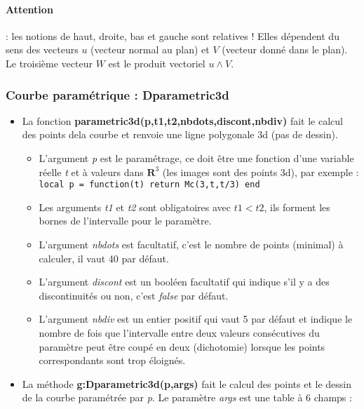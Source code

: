 \paragraph{Attention} : les notions de haut, droite, bas et gauche sont relatives ! Elles dépendent du sens des vecteurs $u$ (vecteur normal au plan) et $V$ (vecteur donné dans le plan). Le troisième vecteur $W$ est le produit vectoriel $u\wedge V$.

\subsubsection{Courbe paramétrique : Dparametric3d}

\begin{itemize}
\item La fonction \textbf{parametric3d(p,t1,t2,nbdots,discont,nbdiv)} fait le calcul des points dela courbe et renvoie une ligne polygonale 3d (pas de dessin).
  \begin{itemize}
    \item L'argument \emph{p} est le paramétrage, ce doit être une fonction d'une variable réelle \emph{t} et à valeurs dans $\mathbf R^3$ (les images sont des points 3d), par exemple :
    \texttt{local p = function(t) return Mc(3,t,t/3) end}
    
    \item  Les arguments \emph{t1} et \emph{t2} sont obligatoires avec \(t1 < t2\), ils forment les bornes de l'intervalle pour le paramètre.
    
    \item L'argument \emph{nbdots} est facultatif, c'est le nombre de points (minimal) à calculer, il vaut 40 par défaut.
    
    \item L'argument \emph{discont} est un booléen facultatif qui indique s'il y a des discontinuités ou non, c'est \emph{false} par défaut.
    
    \item L'argument \emph{nbdiv} est un entier positif qui vaut 5 par défaut et indique le nombre de fois que l'intervalle entre deux valeurs consécutives du paramètre peut être coupé en deux (dichotomie) lorsque les points correspondants sont trop éloignés.
  \end{itemize}
  
\item La méthode \textbf{g:Dparametric3d(p,args)} fait le calcul des points et le dessin de la courbe paramétrée par \emph{p}. Le paramètre \emph{args} est une table à 6 champs :


\end{itemize}
